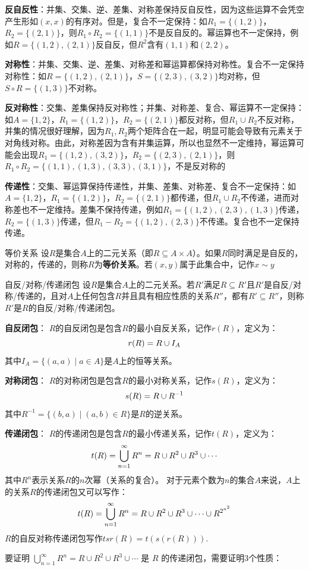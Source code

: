 \textbf{反自反性}：并集、交集、逆、差集、对称差保持反自反性，因为这些运算不会凭空产生形如$(x,x)$的有序对。但是，复合不一定保持：如$R_1 = \{(1,2)\}$，$R_2 = \{(2,1)\}$，则$R_1 \circ R_2 = \{(1,1)\}$不是反自反的。幂运算也不一定保持，例如$R=\{(1,2),(2,1)\}$反自反，但$R^2$含有$(1,1)$和$(2,2)$。

\textbf{对称性}：并集、交集、逆、差集、对称差和幂运算都保持对称性。复合不一定保持对称性：如$R = \{(1,2),(2,1)\}$，$S=\{(2,3),(3,2)\}$均对称，但$S\circ R=\{(1,3)\}$不对称。

\textbf{反对称性}：交集、差集保持反对称性；并集、对称差、复合、幂运算不一定保持：如$A = \{1,2\}$，$R_1 = \{(1,2)\}$，$R_2 = \{(2,1)\}$都反对称，但$R_1 \cup R_2$不反对称，并集的情况很好理解，因为$R_1,R_2$两个矩阵合在一起，明显可能会导致有元素关于对角线对称。由此，对称差因为含有并集运算，所以也显然不一定维持，幂运算可能会出现$R_1 = \{(1,2),(3,2)\}$，$R_2 = \{(2,3),(2,1)\}$，则$R_1 \circ R_2 = \{(1,1),(1,3),(3,3),(3,1)\}$，不是反对称的

\textbf{传递性}：交集、幂运算保持传递性，并集、差集、对称差、复合不一定保持：如$A = \{1,2\}$，$R_1 = \{(1,2)\}$，$R_2 = \{(2,1)\}$都传递，但$R_1 \cup R_2$不传递，进而对称差也不一定维持。差集不保持传递，例如$R_1=\{(1,2),(2,3),(1,3)\}$传递，$R_2=\{(1,3)\}$传递，但$R_1-R_2=\{(1,2),(2,3)\}$不传递。复合也不一定保持传递。
\begin{definition}{等价关系}{}
设$R$是集合$A$上的二元关系（即$R \subseteq A \times A$）。如果$R$同时满足是自反的，对称的，传递的，则称$R$为\textbf{等价关系}。若$(x,y)$属于此集合中，记作$x\sim y$
\end{definition}
\begin{definition}{自反/对称/传递闭包}{}
    设$R$是集合$A$上的二元关系。若$R'$满足$R \subseteq R'$且$R'$是自反/对称/传递的，且对$A$上任何包含$R$并且具有相应性质的关系$R''$，都有$R'\subseteq R''$，则称$R'$是$R$的自反/对称/传递闭包。

\textbf{自反闭包}：
$R$的自反闭包是包含$R$的最小自反关系，记作$r(R)$，定义为：\vspace{-10pt}
$$r(R) = R \cup I_A\vspace{-10pt}$$
其中$I_A = \{(a,a) \mid a \in A\}$是$A$上的恒等关系。

\textbf{对称闭包}：
$R$的对称闭包是包含$R$的最小对称关系，记作$s(R)$，定义为：\vspace{-10pt}
$$s(R) = R \cup R^{-1}\vspace{-10pt}$$
其中$R^{-1} = \{(b,a) \mid (a,b) \in R\}$是$R$的逆关系。

\textbf{传递闭包}：
$R$的传递闭包是包含$R$的最小传递关系，记作$t(R)$，定义为：\vspace{-10pt}
$$t(R) = \bigcup_{n=1}^{\infty} R^n = R \cup R^2 \cup R^3 \cup \cdots\vspace{-10pt}$$
其中$R^n$表示关系$R$的$n$次幂（关系的复合）。 对于元素个数为$n$的集合$A$来说，$A$上的关系$R$的传递闭包又可以写作：
\vspace{-10pt}
$$t(R) = \bigcup_{n=1}^{\infty} R^n = R \cup R^2 \cup R^3 \cup \cdots\cup R^{2^{n^2}}\vspace{-10pt}$$
$R$的自反对称传递闭包写作$tsr(R)=t(s(r(R)))$.
\end{definition}
要证明 $\bigcup_{n=1}^{\infty} R^n = R \cup R^2 \cup R^3 \cup \cdots$ 是 $R$ 的传递闭包，需要证明3个性质：

